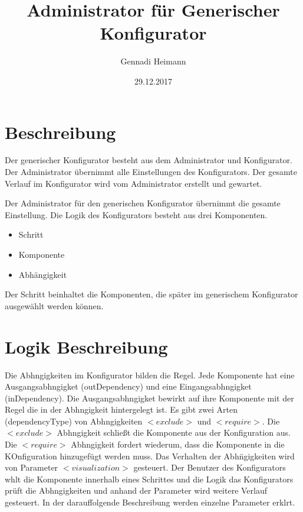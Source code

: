 \documentclass{article}
\begin{document}
\begin{titlepage}

\author{Gennadi Heimann}
\title{Administrator für Generischer Konfigurator}
\date{29.12.2017}
\maketitle
\end{titlepage}

\section{Beschreibung}

Der generischer Konfigurator besteht aus dem Administrator und Konfigurator. Der Administrator übernimmt alle Einstellungen des Konfigurators.
Der gesamte Verlauf im Konfigurator wird vom Administrator erstellt und gewartet.  

Der Administrator für den generischen Konfigurator übernimmt die gesamte Einstellung.
Die Logik des Konfigurators besteht aus drei Komponenten.
\begin{itemize}
  \item Schritt
  \item Komponente
  \item Abhängigkeit
\end{itemize} 

Der Schritt beinhaltet die Komponenten, die später im generischem Konfigurator ausgewählt werden können.



\section{Logik Beschreibung}

Die Abhngigkeiten im Konfigurator bilden die Regel. Jede Komponente hat eine
Ausgangsabhngigket (outDependency) und eine Eingangsabhngigket
(inDependency). Die Ausgangsabhngigket bewirkt auf ihre Komponente mit der
Regel die in der Abhngigkeit hintergelegt ist.
Es gibt zwei Arten (dependencyType) von Abhngigkeiten $<exclude>$ und
$<require>$. Die $<exclude>$ Abhngigkeit schlie\ss{}t die Komponente aus der
Konfiguration aus. Die $<require>$ Abhngigkeit fordert wiederum, dass die
Komponente in die KOnfiguration hinzugef\"ugt werden muss. Das Verhalten der
Abh\"ngigkeiten wird von Parameter $<visualization>$ gesteuert. Der Benutzer
des Konfigurators whlt die Komponente innerhalb eines Schrittes und die
Logik das Konfigurators pr\"uft die Abhngigkeiten und anhand der Parameter
wird weitere Verlauf gesteuert. In der darauffolgende Beschreibung werden
einzelne Parameter erklrt.
\end{document}
